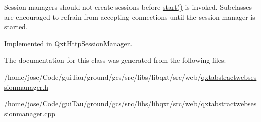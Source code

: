 Session managers should not create sessions before \hyperlink{class_qxt_abstract_web_session_manager_a7073788d4579dea02455bab7fcd45aff}{start()} is invoked. Subclasses are encouraged to refrain from accepting connections until the session manager is started. 

Implemented in \hyperlink{class_qxt_http_session_manager_ab69e72d7fbabb35d88fc7969aa1c2458}{Qxt\-Http\-Session\-Manager}.



The documentation for this class was generated from the following files\-:\begin{DoxyCompactItemize}
\item 
/home/jose/\-Code/gui\-Tau/ground/gcs/src/libs/libqxt/src/web/\hyperlink{qxtabstractwebsessionmanager_8h}{qxtabstractwebsessionmanager.\-h}\item 
/home/jose/\-Code/gui\-Tau/ground/gcs/src/libs/libqxt/src/web/\hyperlink{qxtabstractwebsessionmanager_8cpp}{qxtabstractwebsessionmanager.\-cpp}\end{DoxyCompactItemize}
